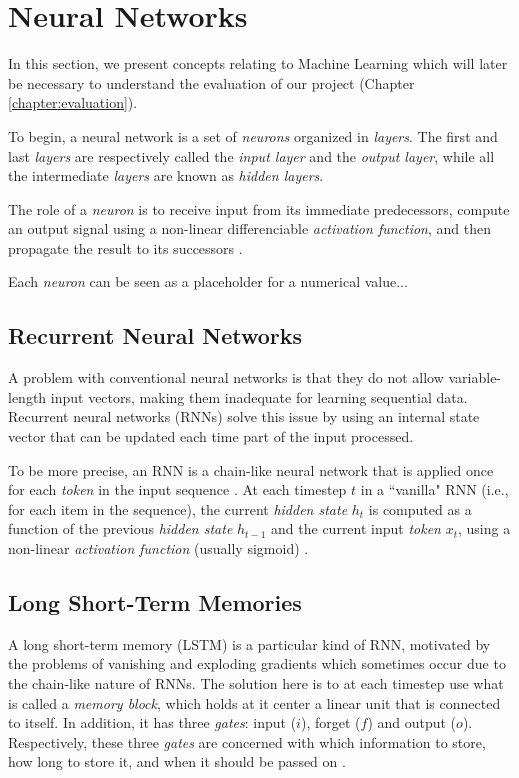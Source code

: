 \section{Neural Networks}
\label{sec:neural_networks}

In this section, we present concepts relating to Machine Learning which will later be necessary to understand the evaluation of our project (Chapter \ref{chapter:evaluation}).

To begin, a neural network is a set of \textit{neurons} organized in \textit{layers}. The first and last \textit{layers} are respectively called the \textit{input layer} and the \textit{output layer}, while all the intermediate \textit{layers} are known as \textit{hidden layers}.

The role of a \textit{neuron} is to receive input from its immediate predecessors, compute an output signal using a non-linear differenciable \textit{activation function}, and then propagate the result to its successors \cite{krose_introduction_1993}.

Each \textit{neuron} can be seen as a placeholder for a numerical value...

\subsection{Recurrent Neural Networks}

A problem with conventional neural networks is that they do not allow variable-length input vectors, making them inadequate for learning sequential data. Recurrent neural networks (RNNs) solve this issue by using an internal state vector that can be updated each time part of the input processed.

To be more precise, an RNN is a chain-like neural network that is applied once for each \textit{token} in the input sequence \cite{cho_learning_2014}. At each timestep $t$ in a ``vanilla" RNN (i.e., for each item in the sequence), the current \textit{hidden state} $h_t$ is computed as a function of the previous \textit{hidden state} $h_{t-1}$ and the current input \textit{token} $x_t$, using a non-linear \textit{activation function} (usually sigmoid) \cite{cho_learning_2014}.

\subsection{Long Short-Term Memories}

A long short-term memory (LSTM) is a particular kind of RNN, motivated by the problems of vanishing and exploding gradients which sometimes occur due to the chain-like nature of RNNs. The solution here is to at each timestep use what is called a \textit{memory block}, which holds at it center a linear unit that is connected to itself. In addition, it has three \textit{gates}: input ($i$), forget ($f$) and output ($o$). Respectively, these three \textit{gates} are concerned with which information to store, how long to store it, and when it should be passed on \cite{gers_learning_2000}.

